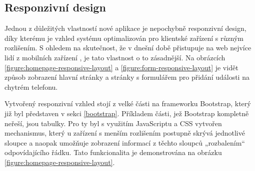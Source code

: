 \subsection{Responzivní design}
Jednou z důležitých vlastností nové aplikace je nepochybně responzivní design, díky kterému je vzhled systému optimalizován pro klientské zařízení s různým rozlišením. S ohledem na skutečnost, že v dnešní době přistupuje na web nejvíce lidí z mobilních zařízení \cite{deviceusage}, je tato vlastnost o to zásadnější. Na obrázcích \ref{figure:homepage-responsive-layout} a \ref{figure:form-responsive-layout} je vidět způsob zobrazení hlavní stránky a stránky s formulářem pro přidání události na chytrém telefonu.

Vytvořený responzivní vzhled stojí z velké části na frameworku Bootstrap, který již byl představen v sekci \ref{bootstrap}. Příkladem části, jež Bootstrap kompletně neřeší, jsou tabulky. Pro ty byl s využitím JavaScriptu a CSS vytvořen mechanismus, který u zařízení s menším rozlišením postupně skrývá jednotlivé sloupce a naopak umožňuje zobrazení informací z těchto sloupců „rozbalením“ odpovídajícího řádku. Tato funkcionalita je demonstrována na obrázku \ref{figure:homepage-responsive-layout}.

